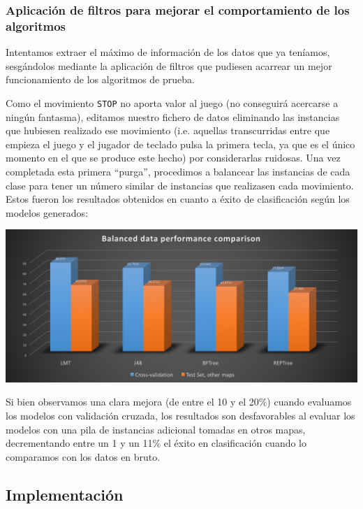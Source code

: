 \documentclass[12pt]{article}
\begin{document}
\subsubsection{Aplicación de filtros para mejorar el comportamiento de los algoritmos}

Intentamos extraer el máximo de información de los datos que ya teníamos, sesgándolos mediante la aplicación de filtros que pudiesen acarrear un mejor funcionamiento de los algoritmos de prueba.

Como el movimiento \texttt{STOP} no aporta valor al juego (no conseguirá acercarse a ningún fantasma), editamos nuestro fichero de datos eliminando las instancias que hubiesen realizado ese movimiento (i.e. aquellas transcurridas entre que empieza el juego y el jugador de teclado pulsa la primera tecla, ya que es el único momento en el que se produce este hecho) por considerarlas ruidosas. Una vez completada esta primera ``purga'', procedimos a balancear las instancias de cada clase para tener un número similar de instancias que realizasen cada movimiento. Estos fueron los resultados obtenidos en cuanto a éxito de clasificación según los modelos generados:

\newpage
\noindent \includegraphics[width=\textwidth]{balanced_performance}

\vspace{0.3cm}

Si bien observamos una clara mejora (de entre el 10 y el 20\%) cuando evaluamos los modelos con validación cruzada, los resultados son desfavorables al evaluar los modelos con una pila de instancias adicional tomadas en otros mapas, decrementando entre un 1 y un 11\% el éxito en clasificación cuando lo comparamos con los datos en bruto.

\subsection{Implementación}
\end{document}
